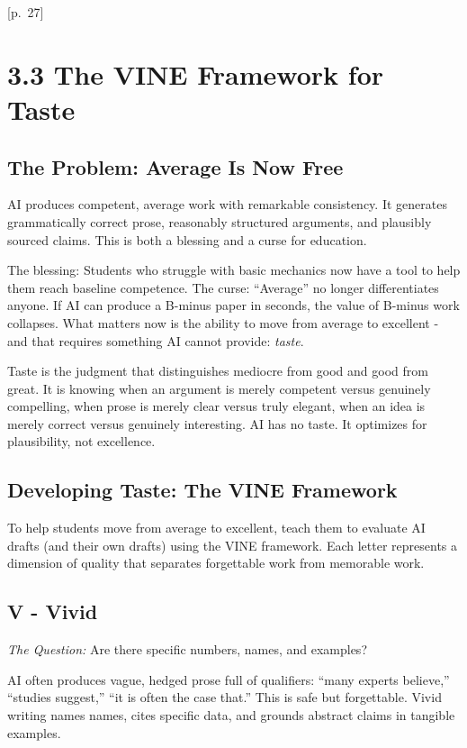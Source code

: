 \documentclass[
  letterpaper,
  DIV=11,
  numbers=noendperiod]{scrreprt}
\begin{document}
{[}p.~27{]}

\section{3.3 The VINE Framework for
Taste}\label{the-vine-framework-for-taste}

\subsection{The Problem: Average Is Now
Free}\label{the-problem-average-is-now-free}

AI produces competent, average work with remarkable consistency. It
generates grammatically correct prose, reasonably structured arguments,
and plausibly sourced claims. This is both a blessing and a curse for
education.

The blessing: Students who struggle with basic mechanics now have a tool
to help them reach baseline competence. The curse: ``Average'' no longer
differentiates anyone. If AI can produce a B-minus paper in seconds, the
value of B-minus work collapses. What matters now is the ability to move
from average to excellent - and that requires something AI cannot
provide: \emph{taste}.

Taste is the judgment that distinguishes mediocre from good and good
from great. It is knowing when an argument is merely competent versus
genuinely compelling, when prose is merely clear versus truly elegant,
when an idea is merely correct versus genuinely interesting. AI has no
taste. It optimizes for plausibility, not excellence.

\subsection{Developing Taste: The VINE
Framework}\label{developing-taste-the-vine-framework}

To help students move from average to excellent, teach them to evaluate
AI drafts (and their own drafts) using the VINE framework. Each letter
represents a dimension of quality that separates forgettable work from
memorable work.

\subsection{V - Vivid}\label{v---vivid}

\emph{The Question:} Are there specific numbers, names, and examples?

AI often produces vague, hedged prose full of qualifiers: ``many experts
believe,'' ``studies suggest,'' ``it is often the case that.'' This is
safe but forgettable. Vivid writing names names, cites specific data,
and grounds abstract claims in tangible examples.
\end{document}
